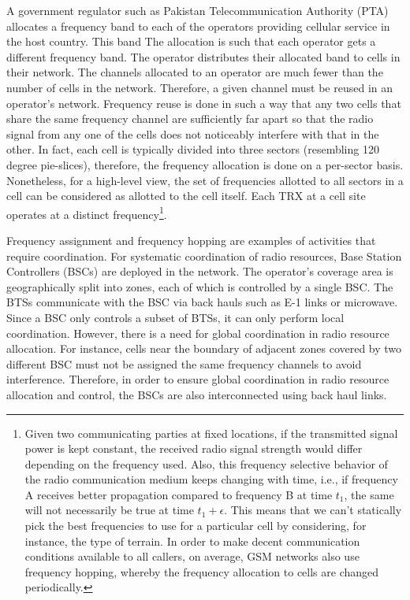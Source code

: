 A government regulator such as Pakistan Telecommunication Authority (PTA) allocates a frequency band to each of the operators providing cellular service in the host country. This band The allocation is such that each operator gets a different frequency band. The operator distributes their allocated band to cells in their network. The channels allocated to an operator are much fewer than the number of cells in the network. Therefore, a given channel must be reused in an operator's network. Frequency reuse is done in such a way that any two cells that share the same frequency channel are sufficiently far apart so that the radio signal from any one of the cells does not noticeably interfere with that in the other. In fact, each cell is typically divided into three sectors (resembling 120 degree pie-slices), therefore, the frequency allocation is done on a per-sector basis. Nonetheless, for a high-level view, the set of frequencies allotted to all sectors in a cell can be considered as allotted to the cell itself. Each TRX at a cell site operates at a distinct frequency\footnote{Given two communicating parties at fixed locations, if the transmitted signal power is kept constant, the received radio signal strength would differ depending on the frequency used. Also, this frequency selective behavior of the radio communication medium keeps changing with time, i.e., if frequency A receives better propagation compared to frequency B at time $t_1$, the same will not necessarily be true at time $t_1+\epsilon$. This means that we can't statically pick the best frequencies to use for a particular cell by considering, for instance, the type of terrain. In order to make decent communication conditions available to all callers, on average, GSM networks also use frequency hopping, whereby the frequency allocation to cells are changed periodically.}. 

Frequency assignment and frequency hopping are examples of activities that require coordination. For systematic coordination of radio resources, Base Station Controllers (BSCs) are deployed in the network. The operator's coverage area is geographically split into zones, each of which is controlled by a single BSC. The BTSs communicate with the BSC via back hauls such as E-1 links or microwave. Since a BSC only controls a subset of BTSs, it can only perform local coordination. However, there is a need for global coordination in radio resource allocation. For instance, cells near the boundary of adjacent zones covered by two different BSC must not be assigned the same frequency channels to avoid interference. Therefore, in order to ensure global coordination in radio resource allocation and control, the BSCs are also interconnected using back haul links.

